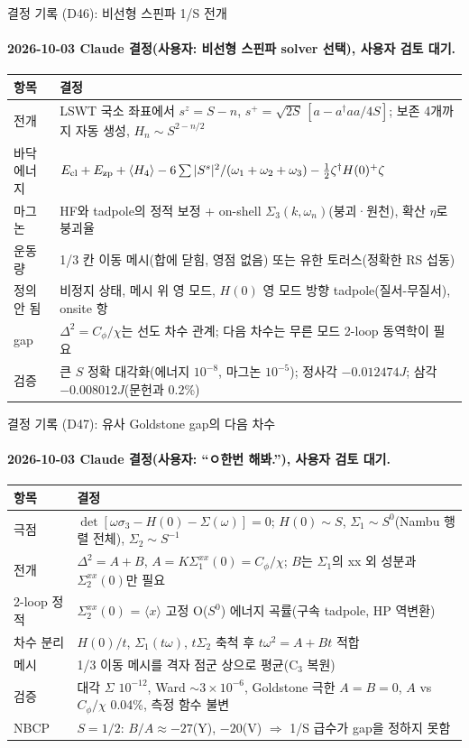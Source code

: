 \begin{frame}[label=decisions-d46-nlswt]{결정 기록 (D46): 비선형 스핀파 1/S 전개}
  \framesubtitle{2026-10-03 Claude 결정(사용자: 비선형 스핀파 solver 선택), 사용자 검토 대기.}
  \small\renewcommand{\arraystretch}{1.12}
  \begin{tabularx}{\textwidth}{@{}P{3.0cm}Y@{}}
    \toprule
    항목 & 결정 \\
    \midrule
    전개 & LSWT 국소 좌표에서 $s^z=S-n$, $s^+=\sqrt{2S}\,[a-a^\dagger aa/4S]$; 보존 4개까지 자동 생성, $H_n\sim S^{2-n/2}$ \\
    바닥 에너지 & $E_{\rm cl}+E_{\rm zp}+\langle H_4\rangle-6\sum|S^s|^2/(\omega_1+\omega_2+\omega_3)-\tfrac12\zeta^\dagger H(0)^+\zeta$ \\
    마그논 & HF와 tadpole의 정적 보정 + on-shell $\Sigma_3(k,\omega_n)$(붕괴·원천), 확산 $\eta$로 붕괴율 \\
    운동량 & 1/3 칸 이동 메시(합에 닫힘, 영점 없음) 또는 유한 토러스(정확한 RS 섭동) \\
    정의 안 됨 & 비정지 상태, 메시 위 영 모드, $H(0)$ 영 모드 방향 tadpole(질서-무질서), onsite 항 \\
    gap & $\Delta^2=C_\phi/\chi$는 선도 차수 관계; 다음 차수는 무른 모드 2-loop 동역학이 필요 \\
    검증 & 큰 $S$ 정확 대각화(에너지 $10^{-8}$, 마그논 $10^{-5}$); 정사각 $-0.012474J$; 삼각 $-0.008012J$(문헌과 0.2\%) \\
    \bottomrule
  \end{tabularx}
\end{frame}

\begin{frame}[label=decisions-d47-pseudo-goldstone]{결정 기록 (D47): 유사 Goldstone gap의 다음 차수}
  \framesubtitle{2026-10-03 Claude 결정(사용자: ``ㅇ한번 해봐.''), 사용자 검토 대기.}
  \small\renewcommand{\arraystretch}{1.12}
  \begin{tabularx}{\textwidth}{@{}P{3.0cm}Y@{}}
    \toprule
    항목 & 결정 \\
    \midrule
    극점 & $\det[\omega\sigma_3-H(0)-\Sigma(\omega)]=0$; $H(0)\sim S$, $\Sigma_1\sim S^0$(Nambu 행렬 전체), $\Sigma_2\sim S^{-1}$ \\
    전개 & $\Delta^2=A+B$, $A=K\Sigma_1^{xx}(0)=C_\phi/\chi$; $B$는 $\Sigma_1$의 xx 외 성분과 $\Sigma_2^{xx}(0)$만 필요 \\
    2-loop 정적 & $\Sigma_2^{xx}(0)$ = $\langle x\rangle$ 고정 O($S^0$) 에너지 곡률(구속 tadpole, HP 역변환) \\
    차수 분리 & $H(0)/t$, $\Sigma_1(t\omega)$, $t\Sigma_2$ 축척 후 $t\omega^2=A+Bt$ 적합 \\
    메시 & 1/3 이동 메시를 격자 점군 상으로 평균(C$_3$ 복원) \\
    검증 & 대각 $\Sigma$ $10^{-12}$, Ward $\sim3\times10^{-6}$, Goldstone 극한 $A=B=0$, $A$ vs $C_\phi/\chi$ 0.04\%, 측정 함수 불변 \\
    NBCP & $S=1/2$: $B/A\approx-27$(Y), $-20$(V) $\Rightarrow$ 1/S 급수가 gap을 정하지 못함 \\
    \bottomrule
  \end{tabularx}
\end{frame}

